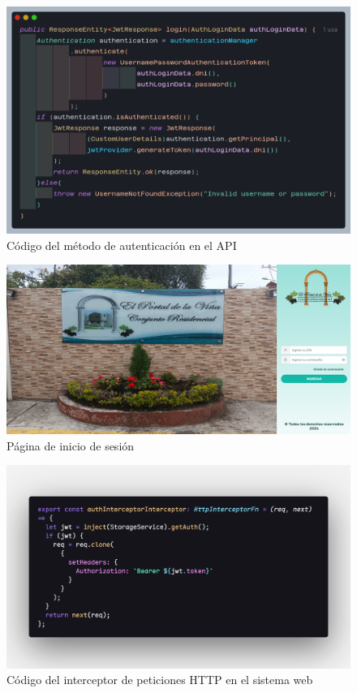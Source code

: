 \begin{figure}[H]
    \centering
    \includegraphics[width=1\textwidth]{resources/images/api-auth-login-usecase}
    \caption{Código del método de autenticación en el API}
    \label{fig:api-auth-login-usecase}
\end{figure}

\begin{figure}[H]
    \centering
    \includegraphics[width=1\textwidth]{resources/images/sw-login}
    \caption{Página de inicio de sesión}
    \label{fig:sw-login-page}
\end{figure}

\begin{figure}[H]
    \centering
    \includegraphics[width=1\textwidth]{resources/images/sw-interceptor}
    \caption{Código del interceptor de peticiones HTTP en el sistema web}
    \label{fig:sw-interceptor}
\end{figure}

